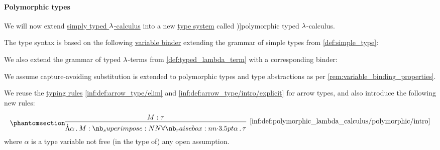 \paragraph{Polymorphic types}

\begin{definition}\label{def:polymorphic_typed_lambda_calculus}
  We will now extend \hyperref[con:simple_type_theory/arrow]{simply typed \( {\mathrm \lambda} \)-calculus} into a new \hyperref[def:abstract_type_system]{type system} called \term[en=polymorphic typed lambda calculus (\cite[164]{Barendregt1992LambdaCalculiWithTypes})]{polymorphic typed \( {\mathrm \lambda} \)-calculus}.

  The type syntax is based on the following \hyperref[con:variable_binding]{variable binder} extending the grammar of simple types from \cref{def:simple_type}:
  \begin{bnf*}
     {\bnftsq{\( \synforall \)} \bnfsp {} \bnfsp {} \bnfsp {}}
  \end{bnf*}

  We also extend the grammar of typed \( {\mathrm \lambda} \)-terms from \cref{def:typed_lambda_term} with a corresponding binder:
  \begin{bnf*}
     {\bnftsq{\( \syn\Lambda \)} \bnfsp {} \bnfsp {} \bnfsp {}}
  \end{bnf*}

  We assume capture-avoiding substitution is extended to polymorphic types and type abstractions as per \cref{rem:variable_binding_properties}.

  We reuse the \hyperref[con:typing_rule]{typing rules} \ref{inf:def:arrow_type/elim} and \ref{inf:def:arrow_type/intro/explicit} for arrow types, and also introduce the following new rules:
  \begin{paracol}{2}
    \begin{leftcolumn}
      \ParacolAlignmentHack
      \begin{equation*}\taglabel[\ensuremath{ \forall_+ }]{inf:def:polymorphic_lambda_calculus/polymorphic/intro}
        \begin{prooftree}
          \hypo{ M: \tau }
          \infer1[\ref{inf:def:polymorphic_lambda_calculus/polymorphic/intro}]{ \qAbs \alpha M: \qpolytype \alpha \tau },
        \end{prooftree}
      \end{equation*}
      where \( \alpha \) is a type variable not free (in the type of) any open assumption.
    \end{leftcolumn}


\end{paracol}
\end{definition}
